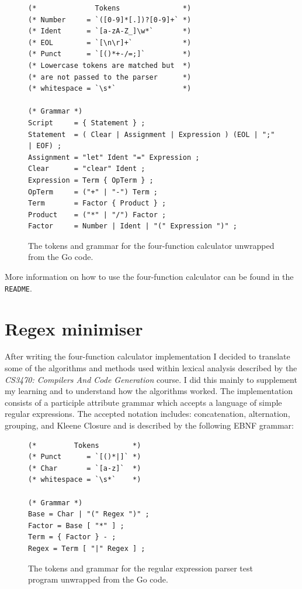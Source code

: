 \documentclass[]{full}
\theoremstyle{definition}
\begin{document}
\begin{figure}[H]
    \begin{verbatim}
(*              Tokens               *)
(* Number     = `([0-9]*[.])?[0-9]+` *)
(* Ident      = `[a-zA-Z_]\w*`       *)
(* EOL        = `[\n\r]+`            *)
(* Punct      = `[()*+-/=;]`         *)
(* Lowercase tokens are matched but  *)
(* are not passed to the parser      *)
(* whitespace = `\s*`                *)

(* Grammar *)
Script     = { Statement } ;
Statement  = ( Clear | Assignment | Expression ) (EOL | ";" | EOF) ;
Assignment = "let" Ident "=" Expression ;
Clear      = "clear" Ident ;
Expression = Term { OpTerm } ;
OpTerm     = ("+" | "-") Term ;
Term       = Factor { Product } ;
Product    = ("*" | "/") Factor ;
Factor     = Number | Ident | "(" Expression ")" ;
    \end{verbatim}
    \cprotect\caption{The tokens and grammar for the four-function calculator unwrapped from the Go code.}
\end{figure}

More information on how to use the four-function calculator can be found in the \verb|README|.

\section{Regex minimiser}

After writing the four-function calculator implementation I decided to translate some of the algorithms and methods used within lexical analysis described by the \textit{CS3470: Compilers And Code Generation} course. I did this mainly to supplement my learning and to understand how the algorithms worked. The implementation consists of a participle attribute grammar which accepts a language of simple regular expressions. The accepted notation includes: concatenation, alternation, grouping, and Kleene Closure and is described by the following EBNF grammar:

\begin{figure}[H]
    \begin{verbatim}
(*         Tokens        *)
(* Punct      = `[()*|]` *)
(* Char       = `[a-z]`  *)
(* whitespace = `\s*`    *)

(* Grammar *)
Base = Char | "(" Regex ")" ;
Factor = Base [ "*" ] ;
Term = { Factor } - ;
Regex = Term [ "|" Regex ] ;
    \end{verbatim}
    \cprotect\caption{The tokens and grammar for the regular expression parser test program unwrapped from the Go code.}
\end{figure}
\end{document}
